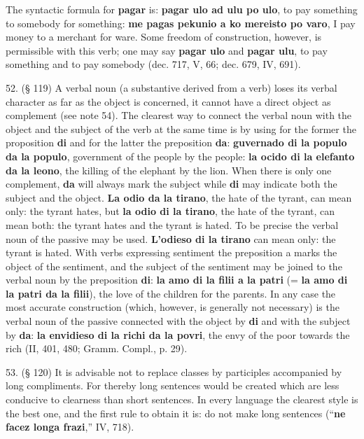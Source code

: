 The syntactic formula for \textbf{pagar} is: \textbf{pagar ulo ad ulu po ulo}, to pay something to somebody for something: \textbf{me pagas pekunio a ko mereisto po varo}, I pay money to a merchant for ware. Some freedom of construction, however, is permissible with this verb; one may say \textbf{pagar ulo} and \textbf{pagar ulu}, to pay something and to pay somebody (dec. 717, V, 66; dec. 679, IV, 691).

52. (§ 119) A verbal noun (a substantive derived from a verb) loses its verbal character as far as the object is concerned, it cannot have a direct object as complement (see note 54). The clearest way to connect the verbal noun with the object and the subject of the verb at the same time is by using for the former the proposition \textbf{di} and for the latter the preposition \textbf{da}: \textbf{guvernado di la populo da la populo}, government of the people by the people: \textbf{la ocido di la elefanto da la leono}, the killing of the elephant by the lion. When there is only one complement, \textbf{da} will always mark the subject while \textbf{di} may indicate both the subject and the object. \textbf{La odio da la tirano}, the hate of the tyrant, can mean only: the tyrant hates, but \textbf{la odio di la tirano}, the hate of the tyrant, can mean both: the tyrant hates and the tyrant is hated. To be precise the verbal noun of the passive may be used. \textbf{L'odieso di la tirano} can mean only: the tyrant is hated. With verbs expressing sentiment the preposition a marks the object of the sentiment, and the subject of the sentiment may be joined to the verbal noun by the preposition \textbf{di}: \textbf{la amo di la filii a la patri} (= \textbf{la amo di la patri da la filii}), the love of the children for the parents. In any case the most accurate construction (which, however, is generally not necessary) is the verbal noun of the passive connected with the object by \textbf{di} and with the subject by \textbf{da}: \textbf{la envidieso di la richi da la povri}, the envy of the poor towards the rich (II, 401, 480; Gramm. Compl., p. 29). %

53. (§ 120) It is advisable not to replace classes by participles accompanied by long compliments. For thereby long sentences would be created which are less conducive to clearness than short sentences. In every language the clearest style is the best one, and the first rule to obtain it is: do not make long sentences (``\textbf{ne facez longa frazi},'' IV, 718). %

